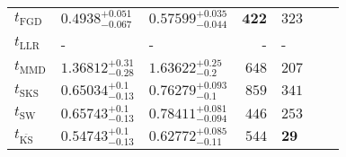 \begin{tabular}{l|llr|llr}
	\midrule
	$t_{\mathrm{FGD}}$ & ${\mathbf{0.4938_{-0.067}^{+0.051}}}$ & ${\mathbf{0.57599_{-0.044}^{+0.035}}}$ & ${\mathbf{422}}$ & $323$ \\
	$t_{\mathrm{LLR}}$ & - & - & - & - \\
	$t_{\mathrm{MMD}}$ & $1.36812_{-0.28}^{+0.31}$ & $1.63622_{-0.2}^{+0.25}$ & $648$ & $207$ \\
	$t_{\mathrm{SKS}}$ & $0.65034_{-0.13}^{+0.1}$ & $0.76279_{-0.1}^{+0.093}$ & $859$ & $341$ \\
	$t_{\mathrm{SW}}$ & $0.65743_{-0.13}^{+0.1}$ & $0.78411_{-0.094}^{+0.081}$ & $446$ & $253$ \\
	$t_{\overline{\mathrm{KS}}}$ & $0.54743_{-0.13}^{+0.1}$ & $0.62772_{-0.11}^{+0.085}$ & $544$ & ${\mathbf{29}}$ \\
	\bottomrule
\end{tabular}